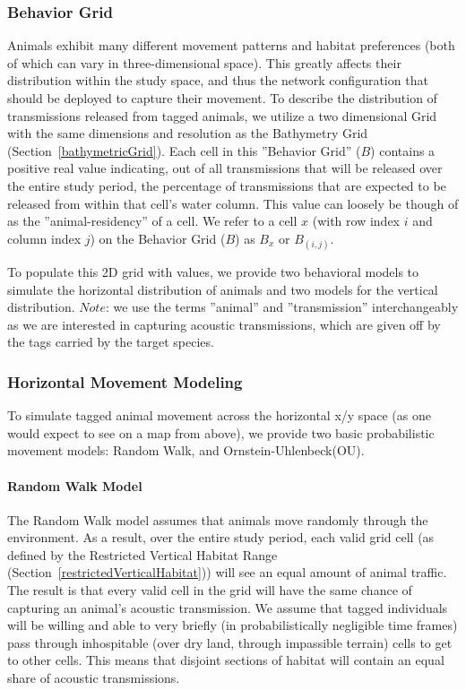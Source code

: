 \subsubsection{Behavior Grid}
\label{behaviorGrid}
Animals exhibit many different movement patterns and habitat preferences (both of which can vary in three-dimensional space).  This greatly affects their distribution within the study space, and thus the network configuration that should be deployed to capture their movement.  To describe the distribution of transmissions released from tagged animals, we utilize a two dimensional Grid with the same dimensions and resolution as the Bathymetry Grid (Section~\ref{bathymetricGrid}).  Each cell in this ''Behavior Grid'' ($B$) contains a positive real value indicating, out of all transmissions that will be released over the entire study period, the percentage of transmissions that are expected to be released from within that cell's water column.  This value can loosely be though of as the ''animal-residency'' of a cell.  We refer to a cell $x$ (with row index $i$ and column index $j$) on the Behavior Grid ($B$) as $B_x$ or $B_{(i,j)}$.

To populate this 2D grid with values, we provide two behavioral models to simulate the horizontal distribution of animals and two models for the vertical distribution.  $Note$: we use the terms ''animal'' and ''transmission'' interchangeably as we are interested in capturing acoustic transmissions, which are given off by the tags carried by the target species.  


\subsubsection{Horizontal Movement Modeling}
\label{animalMovementModel}
To simulate tagged animal movement across the horizontal x/y space (as one would expect to see on a map from above), we provide two basic probabilistic movement models: Random Walk, and Ornstein-Uhlenbeck(OU).  

\paragraph{Random Walk Model}
\label{randomWalkModel}
The Random Walk model assumes that animals move randomly through the environment.  As a result, over the entire study period, each valid grid cell (as defined by the Restricted Vertical Habitat Range (Section~\ref{restrictedVerticalHabitat})) will see an equal amount of animal traffic.  The result is that every valid cell  in the grid will have the same chance of capturing an animal's acoustic transmission.  We assume that tagged individuals will be willing and able to very briefly (in probabilistically negligible time frames) pass through inhospitable (over dry land, through impassible terrain) cells to get to other cells.  This means that disjoint sections of habitat will contain an equal share of acoustic transmissions.

